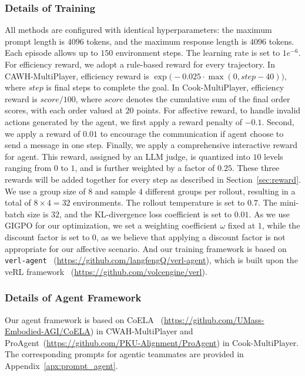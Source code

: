 \documentclass{article}
\theoremstyle{plain}
\theoremstyle{definition}
\theoremstyle{remark}
\begin{document}
\subsubsection{Details of Training}\label{appx:train}
All methods are configured with identical hyperparameters: the maximum prompt length is $4096$ tokens, and the maximum response length is $4096$ tokens. Each episode allows up to $150$ environment steps. The learning rate is set to $1e^{-6}$. For efficiency reward, we adopt a rule-based reward for every trajectory. In CAWH-MultiPlayer, efficiency reward is $ \exp\Big(-0.025 \cdot \max(0, step - 40)\Big)$, where $step$ is final steps to complete the goal. In Cook-MultiPlayer, efficiency reward is $ score / 100$, where $score$ denotes the cumulative sum of the final order scores, with each order valued at $20$ points. For affective reward, to handle invalid actions generated by the agent, we first apply a reward penalty of $-0.1$. Second, we apply a reward of $0.01$ to encourage the communication if agent choose to send a message in one step. Finally, we apply a comprehensive interactive reward for agent. This reward, assigned by an LLM judge, is quantized into $10$ levels ranging from $0$ to $1$, and is further weighted by a factor of $0.25$. These three rewards will be added together for every step as described in Section~\ref{sec:reward}. We use a group size of $8$ and sample $4$ different groups per rollout, resulting in a total of $8 \times 4 = 32$ environments. The rollout temperature is set to $0.7$. The mini-batch size is $32$, and the KL-divergence loss coefficient is set to $0.01$. As we use GIGPO for our optimization, we set a weighting coefficient $\omega$ fixed at $1$, while the discount factor is set to $0$, as we believe that applying a discount factor is not appropriate for our affective scenario. And our training framework is based on \texttt{verl-agent}~\cite{feng2025group} (\url{https://github.com/langfengQ/verl-agent}), which is built upon the veRL framework~\cite{sheng2024hybridflow} (\url{https://github.com/volcengine/verl}).

\subsubsection{Details of Agent Framework}\label{appx:agent}

Our agent framework is based on CoELA~\cite{ZhangDSZDTSG24} (\url{https://github.com/UMass-Embodied-AGI/CoELA}) in CWAH-MultiPlayer and ProAgent~\cite{ZhangYHWLSZZLZC24}(\url{https://github.com/PKU-Alignment/ProAgent}) in Cook-MultiPlayer. The corresponding prompts for agentic teammates are provided in Appendix~\ref{apx:prompt_agent}.
\end{document}
